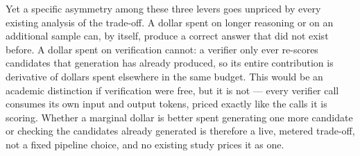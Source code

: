 \documentclass[11pt]{article}
\begin{document}
Yet a specific asymmetry among these three levers goes unpriced by every existing analysis of the trade-off. A dollar spent on longer reasoning or on an additional sample can, by itself, produce a correct answer that did not exist before. A dollar spent on verification cannot: a verifier only ever re-scores candidates that generation has already produced, so its entire contribution is derivative of dollars spent elsewhere in the same budget. This would be an academic distinction if verification were free, but it is not --- every verifier call consumes its own input and output tokens, priced exactly like the calls it is scoring. Whether a marginal dollar is better spent generating one more candidate or checking the candidates already generated is therefore a live, metered trade-off, not a fixed pipeline choice, and no existing study prices it as one.
\end{document}
